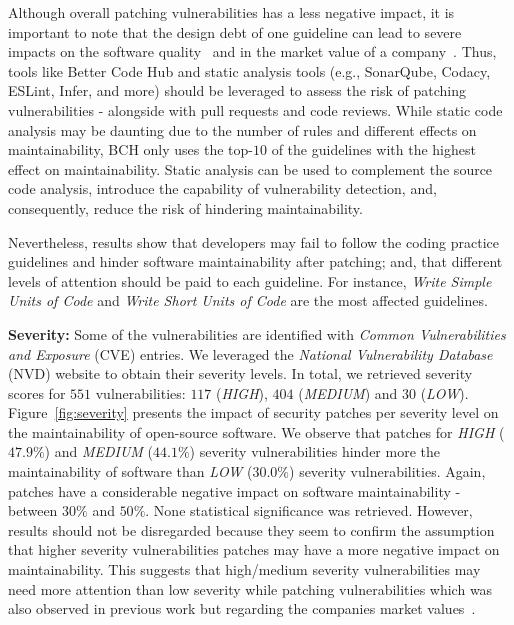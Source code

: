 \documentclass[10pt,conference]{IEEEtran}
\begin{document}
Although overall patching vulnerabilities has a less negative impact, it is 
important to note that the design debt of one guideline can lead
to severe impacts on the software quality~\cite{10.1145/1985362.1985366} 
and in the market value of a company~\cite{4267025}. Thus,
tools like Better Code Hub and static analysis tools (e.g., SonarQube, Codacy,
ESLint, Infer, and more) should be leveraged to 
assess the risk of patching vulnerabilities - alongside with pull
requests and code reviews. While static code analysis
may be daunting due to the number of rules and different effects
on maintainability, BCH only uses the top-$10$ of the guidelines
with the highest effect on maintainability. Static analysis 
can be used to complement the source code analysis, introduce
the capability of vulnerability detection, and, consequently,
reduce the risk of hindering maintainability. 

Nevertheless, results show that developers may fail to follow the coding
practice guidelines and hinder software maintainability after patching; and, 
that different levels of attention should be paid to each guideline. For instance,
\emph{Write Simple Units of Code} and \emph{Write Short Units of Code}
are the most affected guidelines.
%
% 

\textbf{Severity:} Some of the vulnerabilities are identified with \emph{Common 
Vulnerabilities and Exposure} (CVE) entries. We leveraged the \emph{National Vulnerability 
Database} (NVD) website to obtain their severity levels. In total, we 
retrieved severity scores for $551$ vulnerabilities: $117$ (\emph{HIGH}), 
$404$ (\emph{MEDIUM}) and $30$ (\emph{LOW}). Figure~\ref{fig:severity} 
presents the impact of security patches per severity level on the 
maintainability of open-source software. We observe that patches for 
\emph{HIGH} ($47.9\%$) and \emph{MEDIUM} ($44.1\%$) severity vulnerabilities 
hinder more the maintainability of software than \emph{LOW} ($30.0\%$) 
severity vulnerabilities. Again, patches have a considerable 
negative impact on software maintainability - between $30\%$ 
and $50\%$. None statistical significance was retrieved. However, 
results should not be disregarded because they seem to confirm the 
assumption that higher severity vulnerabilities patches may have a 
more negative impact on maintainability. This suggests that high/medium 
severity vulnerabilities may need more attention than low severity while 
patching vulnerabilities which was also observed in previous work but 
regarding the companies market values~\cite{4267025}.
\end{document}
